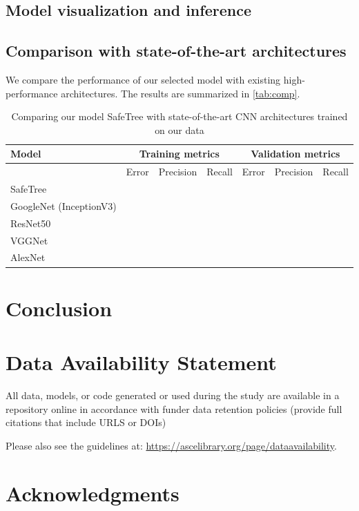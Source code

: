 \documentclass[Journal,letterpaper, SingleSpace, InsideFigs]{ascelike-new}
\begin{document}
\subsection{Model visualization and inference}

\subsection{Comparison with state-of-the-art architectures}
We compare the performance of our selected model with existing high-performance architectures. The results are summarized in \autoref{tab:comp}.

\begin{table}[h!]\small
  \centering
  \begin{tabular}{l l l l l l l }\toprule
    \bf Model & \multicolumn{3}{c}{\bf Training metrics} &\multicolumn{3}{c}{\bf Validation metrics}  \\\midrule
    & Error & Precision & Recall     & Error & Precision & Recall \\
    SafeTree & & & & & & \\
    GoogleNet (InceptionV3) & & & & & & \\
    ResNet50 & & & & & & \\
        VGGNet & & & & & & \\
    AlexNet & & & & & & \\\bottomrule
  \end{tabular}
  \caption{Comparing our model SafeTree with state-of-the-art CNN architectures trained on our data}
  \label{tab:comp}
\end{table}
\section{Conclusion}

\section{Data Availability Statement}
All data, models, or code generated or used during the study are available in a repository online in accordance with funder data retention policies (provide full citations that include URLS or DOIs)

Please also see the guidelines at: \url{https://ascelibrary.org/page/dataavailability}.

\section{Acknowledgments}

\appendix

   
\end{document}
